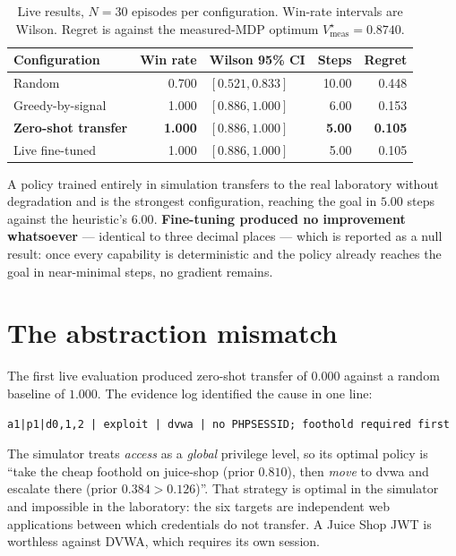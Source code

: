 \documentclass[11pt,a4paper]{report}
\begin{document}
\begin{table}[h]
\centering
\caption{Live results, $N=30$ episodes per configuration. Win-rate intervals are
Wilson. Regret is against the measured-MDP optimum $V^\star_{\text{meas}} = 0.8740$.}
\label{tab:live}
\begin{tabular}{lrlrr}
\toprule
\textbf{Configuration} & \textbf{Win rate} & \textbf{Wilson 95\% CI} & \textbf{Steps} & \textbf{Regret}\\
\midrule
Random             & 0.700 & $[0.521, 0.833]$ & 10.00 & 0.448\\
Greedy-by-signal   & 1.000 & $[0.886, 1.000]$ & 6.00  & 0.153\\
\textbf{Zero-shot transfer} & \textbf{1.000} & $[0.886, 1.000]$ & \textbf{5.00} & \textbf{0.105}\\
Live fine-tuned    & 1.000 & $[0.886, 1.000]$ & 5.00  & 0.105\\
\bottomrule
\end{tabular}
\end{table}

A policy trained entirely in simulation transfers to the real laboratory without
degradation and is the strongest configuration, reaching the goal in $5.00$
steps against the heuristic's $6.00$. \textbf{Fine-tuning produced no
improvement whatsoever} --- identical to three decimal places --- which is
reported as a null result: once every capability is deterministic and the policy
already reaches the goal in near-minimal steps, no gradient remains.

\section{The abstraction mismatch}
\label{sec:mismatch}
The first live evaluation produced zero-shot transfer of $0.000$ against a random
baseline of $1.000$. The evidence log identified the cause in one line:

\begin{lstlisting}
a1|p1|d0,1,2 | exploit | dvwa | no PHPSESSID; foothold required first
\end{lstlisting}

The simulator treats \textit{access} as a \emph{global} privilege level, so its
optimal policy is ``take the cheap foothold on juice-shop (prior $0.810$), then
\emph{move} to dvwa and escalate there (prior $0.384 > 0.126$)''. That strategy
is optimal in the simulator and impossible in the laboratory: the six targets
are independent web applications between which credentials do not transfer. A
Juice Shop JWT is worthless against DVWA, which requires its own session.
\end{document}
